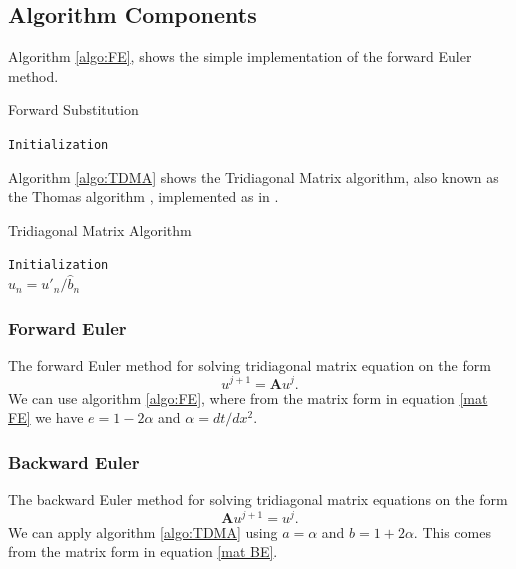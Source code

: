 \documentclass[%
reprint,
nofootinbib,
amsmath,amssymb,
aps,
]{revtex4-1}
\begin{document}
\subsection{Algorithm Components}
Algorithm \ref{algo:FE}, shows the simple implementation of the forward Euler method. 
\begin{algorithm}[H]\label{algo:FE}
	\SetAlgoLined
	\caption{Forward Substitution}
	\texttt{Initialization}\\
\end{algorithm}
Algorithm \ref{algo:TDMA} shows the Tridiagonal Matrix algorithm, also known as the Thomas algorithm \cite{datta2010numerical}, implemented as in \cite{Sigurd1}.
\begin{algorithm}[H]\label{algo:TDMA}
	\SetAlgoLined
	\caption{Tridiagonal Matrix Algorithm}
	\texttt{Initialization}	\\
	\texttt{$\hat{u}_n = u'_n/\hat{b}_n$}\\
\end{algorithm}

\subsubsection{Forward Euler}
The forward Euler method for solving tridiagonal matrix equation on the form 
\begin{equation}
	u^{j+1} = \mathbf{A}u^j.
\end{equation}
We can use algorithm \ref{algo:FE}, where from the matrix form in equation \eqref{mat FE} we have $e = 1 - 2\alpha$ and $\alpha = dt/dx^2$. 
\subsubsection{Backward Euler}
The backward Euler method for solving tridiagonal matrix equations on the form 
\begin{equation}
	\mathbf{A}u^{j+1} = u^j.
\end{equation}
We can apply algorithm \ref{algo:TDMA} using $a = \alpha$ and $b = 1+2\alpha$. This comes from the matrix form in equation \eqref{mat BE}.
\end{document}
